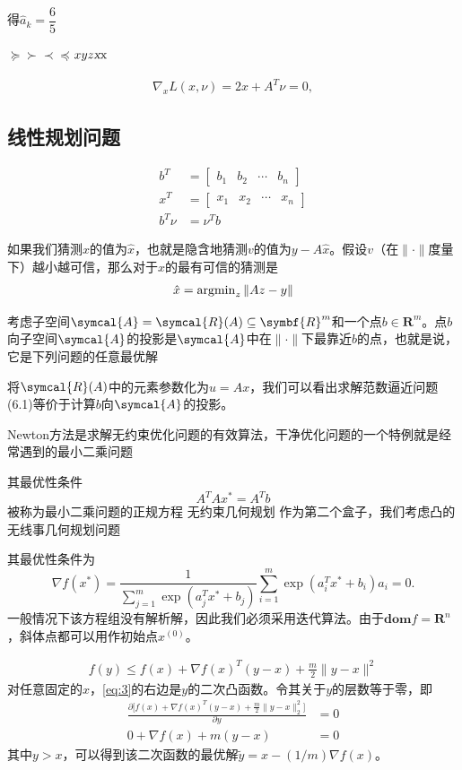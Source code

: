 \documentclass{lsbook}
\begin{document}
得$\hat{a}_k=\dfrac{6}{5}$

$\succeq\succ\prec\preceq$$xyz\textsl{x}\text{x}$

\begin{align*}
\nabla_xL(x,\nu) = 2x + A^T\nu = 0,
\end{align*}
\subsection{线性规划问题}

\begin{align*}
b^T &= \begin{bmatrix}
b_1 & b_2 & \cdots & b_n
\end{bmatrix}\\
x^T &= \begin{bmatrix}
x_1 & x_2 & \cdots & x_n
\end{bmatrix}\\
b^T\nu &= \nu^Tb
\end{align*}

如果我们猜测$x$的值为$\hat{x}$，也就是隐含地猜测$v$的值为$y-A\hat{x}$。假设$v$（在$\|\cdot\|$度量下）越小越可信，那么对于$x$的最有可信的猜测是
\begin{align}
\hat{x} = \operatorname{argmin}_z	\|Az - y\|
\end{align}

考虑子空间$\symcal{A} = \symcal{R}(A)\subseteq\symbf{R}^m$和一个点$b\in\symbf{R}^m$。点$b$向子空间$\symcal{A}$的\textsf{投影}是$\symcal{A}$中在$\|\cdot\|$下最靠近$b$的点，也就是说，它是下列问题的任意最优解

将$\symcal{R}(A)$中的元素参数化为$u=Ax$，我们可以看出求解范数逼近问题(6.1)等价于计算$b$向$\symcal{A}$的投影。

Newton方法是求解无约束优化问题的有效算法，干净优化问题的一个特例就是经常遇到的最小二乘问题

其最优性条件
\[
A^TAx^\ast = A^Tb
\]
被称为最小二乘问题的\textsf{正规方程}
\mbox{无约束几何规划}
作为第二个盒子，我们考虑凸的无线事几何规划问题

其最优性条件为
\[
\nabla f(x^\ast) = \frac{1}{\sum\limits_{j=1}^m\exp(a^T_jx^\ast + b_j)}\sum_{i=1}^{m}\exp(a^T_ix^\ast+b_i)a_i=0.
\]
一般情况下该方程组没有解析解，因此我们必须采用迭代算法。由于$\symbf{dom}f=\symbf{R}^n$，斜体点都可以用作初始点$x^{(0)}$。

\begin{align}\label{eq:3}
f(y) \leqslant f(x) + \nabla f(x)^T(y-x) + \frac{m}{2}\|y-x\|^2
\end{align}
对任意固定的$x$，\cref{eq:3}的右边是$y$的二次凸函数。令其关于$y$的层数等于零，即
\begin{align}\label{eq:4}
\frac{\partial\bigl[f(x) + \nabla f(x)^T(y-x) + \frac{m}{2}\|y-x\|_2^2\bigr]}{\partial y} &= 0\\
0 + \nabla f(x) + m(y-x) &=0\label{eq:5}
\end{align}
其中$y>x$，可以得到该二次函数的最优解$\tilde{y}=x-(1/m)\nabla f(x)$。
\end{document}
